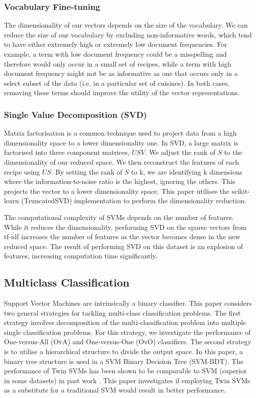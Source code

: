 \documentclass{article}
\def\light#1{{\color{light}#1}}
\begin{document}
\subsubsection*{Vocabulary Fine-tuning}
The dimensionality of our vectors depends on the size of the vocabulary. We can reduce the size of our vocabulary by excluding non-informative words, which tend to have either extremely high or extremely low document frequencies. For example, a term with low document frequency could be a misspelling and therefore would only occur in a small set of recipes, while a term with high document frequency might not be as informative as one that occurs only in a select subset of the data (i.e. in a particular set of cuisines). In both cases, removing these terms should improve the utility of the vector representations.

\subsubsection*{Single Value Decomposition (SVD)} 
Matrix factorisation is a common technique used to project data from a high dimensionality space to a lower dimensionality one. In SVD, a large matrix is factorised into three component matrices, $USV$. We adjust the rank of $S$ to the dimensionality of our reduced space. We then reconstruct the features of each recipe using $US$. By setting the rank of $S$ to k, we are identifying k dimensions where the information-to-noise ratio is the highest, ignoring the others. This projects the vector to a lower dimensionality space. This paper utilises the \light{scikit-learn \cite{scikit-learn} (TruncatedSVD)} implementation to perform the dimensionality reduction. 

The computational complexity of SVMs depends on the number of features. While it reduces the dimensionality, performing SVD on the sparse vectors from tf-idf increases the number of features as the vector becomes dense in the new reduced space. The result of performing SVD on this dataset is an explosion of features, increasing computation time significantly.

\subsection{Multiclass Classification}
Support Vector Machines are intrinsically a binary classifier. This paper considers two general strategies for tackling multi-class classification problems. The first strategy involves decomposition of the multi-classification problem into multiple single classification problems. For this strategy, we investigate the performance of One-versus-All (OvA) and One-versus-One (OvO) classifiers. The second strategy is to utilise a hierarchical structure to divide the output space. In this paper, a binary tree structure is used in a SVM Binary Decision Tree (SVM-BDT). The performance of Twin SVMs has been shown to be comparable to SVM (superior in some datasets) in past work \cite{TSVM}. This paper investigates if employing Twin SVMs as a substitute for a traditional SVM would result in better performance.
\end{document}
